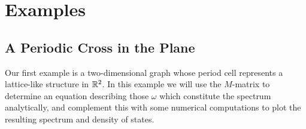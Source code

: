 \section{Examples} \label{sec:Examples}

\subsection{A Periodic Cross in the Plane}
Our first example is a two-dimensional graph whose period cell represents a lattice-like structure in $\mathbb{R}^2$.
In this example we will use the $M$-matrix to determine an equation describing those $\omega$ which constitute the spectrum analytically, and complement this with some numerical computations to plot the resulting spectrum and density of states.

